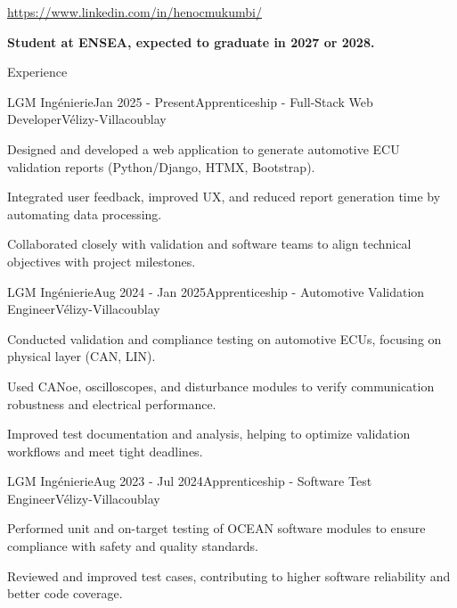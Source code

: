 \documentclass[10pt]{style}
\begin{document}
\begin{center}
	\url{https://www.linkedin.com/in/henocmukumbi/}
\end{center}

\begin{center}
	\textbf{Student at ENSEA, expected to graduate in 2027 or 2028.}
\end{center}


\begin{rSection}{Experience}

	\begin{rSubsection}{LGM Ingénierie}{Jan 2025 - Present}{Apprenticeship - Full-Stack Web Developer}{Vélizy-Villacoublay}
		\item Designed and developed a web application to generate automotive ECU validation reports (Python/Django, HTMX, Bootstrap).
		\item Integrated user feedback, improved UX, and reduced report generation time by automating data processing.
		\item Collaborated closely with validation and software teams to align technical objectives with project milestones.
	\end{rSubsection}

	\begin{rSubsection}{LGM Ingénierie}{Aug 2024 - Jan 2025}{Apprenticeship - Automotive Validation Engineer}{Vélizy-Villacoublay}
		\item Conducted validation and compliance testing on automotive ECUs, focusing on physical layer (CAN, LIN).
		\item Used CANoe, oscilloscopes, and disturbance modules to verify communication robustness and electrical performance.
		\item Improved test documentation and analysis, helping to optimize validation workflows and meet tight deadlines.
	\end{rSubsection}

	\begin{rSubsection}{LGM Ingénierie}{Aug 2023 - Jul 2024}{Apprenticeship - Software Test Engineer}{Vélizy-Villacoublay}
		\item Performed unit and on-target testing of OCEAN software modules to ensure compliance with safety and quality standards.
		\item Reviewed and improved test cases, contributing to higher software reliability and better code coverage.
	\end{rSubsection}


\end{rSection}
\end{document}
